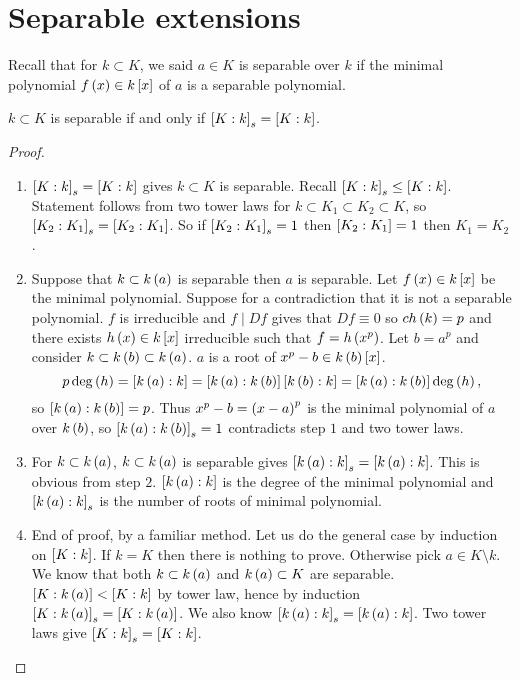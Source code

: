 \pagebreak

\section{Separable extensions}

Recall that for $ k \subset K $, we said $ a \in K $ is separable over $ k $ if the minimal polynomial $ f\rb{x} \in k\sb{x} $ of $ a $ is a separable polynomial.

\begin{theorem}
$ k \subset K $ is separable if and only if $ \sb{K : k}_s = \sb{K : k} $.
\end{theorem}

\begin{proof}
\hfill
\begin{enumerate}[leftmargin=0.5in, label=Step \arabic*.]
\item $ \sb{K : k}_s = \sb{K : k} $ gives $ k \subset K $ is separable. Recall $ \sb{K : k}_s \le \sb{K : k} $. Statement follows from two tower laws for $ k \subset K_1 \subset K_2 \subset K $, so $ \sb{K_2 : K_1}_s = \sb{K_2 : K_1} $. So if $ \sb{K_2 : K_1}_s = 1 $ then $ \sb{K_2 : K_1} = 1 $ then $ K_1 = K_2 $.
\item Suppose that $ k \subset k\rb{a} $ is separable then $ a $ is separable. Let $ f\rb{x} \in k\sb{x} $ be the minimal polynomial. Suppose for a contradiction that it is not a separable polynomial. $ f $ is irreducible and $ f \mid Df $ gives that $ Df \equiv 0 $ so $ ch\rb{k} = p $ and there exists $ h\rb{x} \in k\sb{x} $ irreducible such that $ f = h\rb{x^p} $. Let $ b = a^p $ and consider $ k \subset k\rb{b} \subset k\rb{a} $. $ a $ is a root of $ x^p - b \in k\rb{b}\sb{x} $.
$$ p\deg\rb{h} = \sb{k\rb{a} : k} = \sb{k\rb{a} : k\rb{b}}\sb{k\rb{b} : k} = \sb{k\rb{a} : k\rb{b}}\deg\rb{h}, $$
so $ \sb{k\rb{a} : k\rb{b}} = p $. Thus $ x^p - b = \rb{x - a}^p $ is the minimal polynomial of $ a $ over $ k\rb{b} $, so $ \sb{k\rb{a} : k\rb{b}}_s = 1 $ contradicts step $ 1 $ and two tower laws.
\item For $ k \subset k\rb{a} $, $ k \subset k\rb{a} $ is separable gives $ \sb{k\rb{a} : k}_s = \sb{k\rb{a} : k} $. This is obvious from step $ 2 $. $ \sb{k\rb{a} : k} $ is the degree of the minimal polynomial and $ \sb{k\rb{a} : k}_s $ is the number of roots of minimal polynomial.
\item End of proof, by a familiar method. Let us do the general case by induction on $ \sb{K : k} $. If $ k = K $ then there is nothing to prove. Otherwise pick $ a \in K \setminus k $. We know that both $ k \subset k\rb{a} $ and $ k\rb{a} \subset K $ are separable. $ \sb{K : k\rb{a}} < \sb{K : k} $ by tower law, hence by induction $ \sb{K : k\rb{a}}_s = \sb{K : k\rb{a}} $. We also know $ \sb{k\rb{a} : k}_s = \sb{k\rb{a} : k} $. Two tower laws give $ \sb{K : k}_s = \sb{K : k} $.
\end{enumerate}
\end{proof}

